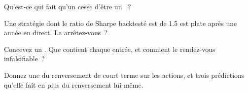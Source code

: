 \begin{interviewq}\label{iq:rs:the-research-process:3}
Qu'est-ce qui fait qu'un  cesse d'être un ~?
\end{interviewq}

\begin{interviewq}\label{iq:rs:the-research-process:4}
Une stratégie dont le ratio de Sharpe backtesté est de 1.5 est plate après une année en direct. La arrêtez-vous~?
\end{interviewq}

\begin{interviewq}\label{iq:rs:the-research-process:5}
Concevez un . Que contient chaque entrée, et comment le rendez-vous infalsifiable~?
\end{interviewq}

\begin{interviewq}\label{iq:rs:the-research-process:6}
Donnez une  du renversement de court terme sur les actions, et trois prédictions qu'elle fait en plus du renversement lui-même.
\end{interviewq}
